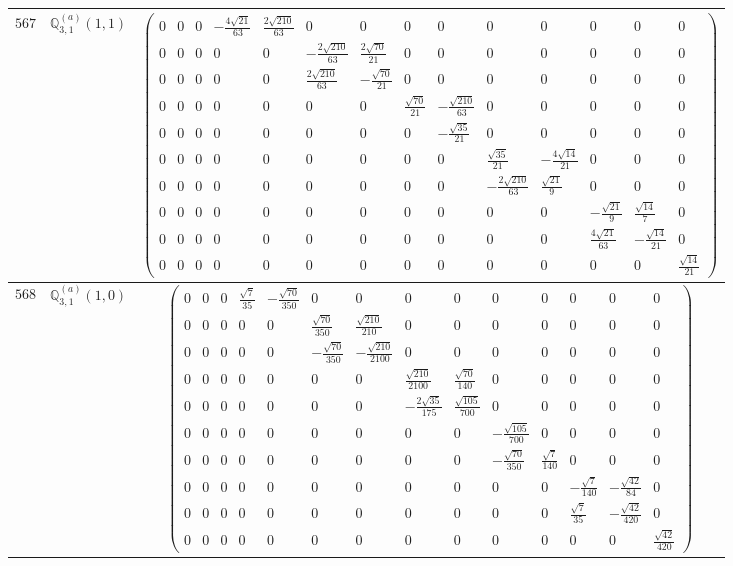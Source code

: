 \documentclass[fleqn,8pt,landscape]{jsarticle}
\begin{document}
\begin{center}
\begin{longtable}{ccc}
$ 567 $ & $ \mathbb{Q}_{3,1}^{(a)}(1,1) $ & $ \begin{pmatrix} 0 & 0 & 0 & - \frac{4 \sqrt{21}}{63} & \frac{2 \sqrt{210}}{63} & 0 & 0 & 0 & 0 & 0 & 0 & 0 & 0 & 0 \\ 0 & 0 & 0 & 0 & 0 & - \frac{2 \sqrt{210}}{63} & \frac{2 \sqrt{70}}{21} & 0 & 0 & 0 & 0 & 0 & 0 & 0 \\ 0 & 0 & 0 & 0 & 0 & \frac{2 \sqrt{210}}{63} & - \frac{\sqrt{70}}{21} & 0 & 0 & 0 & 0 & 0 & 0 & 0 \\ 0 & 0 & 0 & 0 & 0 & 0 & 0 & \frac{\sqrt{70}}{21} & - \frac{\sqrt{210}}{63} & 0 & 0 & 0 & 0 & 0 \\ 0 & 0 & 0 & 0 & 0 & 0 & 0 & 0 & - \frac{\sqrt{35}}{21} & 0 & 0 & 0 & 0 & 0 \\ 0 & 0 & 0 & 0 & 0 & 0 & 0 & 0 & 0 & \frac{\sqrt{35}}{21} & - \frac{4 \sqrt{14}}{21} & 0 & 0 & 0 \\ 0 & 0 & 0 & 0 & 0 & 0 & 0 & 0 & 0 & - \frac{2 \sqrt{210}}{63} & \frac{\sqrt{21}}{9} & 0 & 0 & 0 \\ 0 & 0 & 0 & 0 & 0 & 0 & 0 & 0 & 0 & 0 & 0 & - \frac{\sqrt{21}}{9} & \frac{\sqrt{14}}{7} & 0 \\ 0 & 0 & 0 & 0 & 0 & 0 & 0 & 0 & 0 & 0 & 0 & \frac{4 \sqrt{21}}{63} & - \frac{\sqrt{14}}{21} & 0 \\ 0 & 0 & 0 & 0 & 0 & 0 & 0 & 0 & 0 & 0 & 0 & 0 & 0 & \frac{\sqrt{14}}{21} \end{pmatrix} $ \\ \hline
$ 568 $ & $ \mathbb{Q}_{3,1}^{(a)}(1,0) $ & $ \begin{pmatrix} 0 & 0 & 0 & \frac{\sqrt{7}}{35} & - \frac{\sqrt{70}}{350} & 0 & 0 & 0 & 0 & 0 & 0 & 0 & 0 & 0 \\ 0 & 0 & 0 & 0 & 0 & \frac{\sqrt{70}}{350} & \frac{\sqrt{210}}{210} & 0 & 0 & 0 & 0 & 0 & 0 & 0 \\ 0 & 0 & 0 & 0 & 0 & - \frac{\sqrt{70}}{350} & - \frac{\sqrt{210}}{2100} & 0 & 0 & 0 & 0 & 0 & 0 & 0 \\ 0 & 0 & 0 & 0 & 0 & 0 & 0 & \frac{\sqrt{210}}{2100} & \frac{\sqrt{70}}{140} & 0 & 0 & 0 & 0 & 0 \\ 0 & 0 & 0 & 0 & 0 & 0 & 0 & - \frac{2 \sqrt{35}}{175} & \frac{\sqrt{105}}{700} & 0 & 0 & 0 & 0 & 0 \\ 0 & 0 & 0 & 0 & 0 & 0 & 0 & 0 & 0 & - \frac{\sqrt{105}}{700} & 0 & 0 & 0 & 0 \\ 0 & 0 & 0 & 0 & 0 & 0 & 0 & 0 & 0 & - \frac{\sqrt{70}}{350} & \frac{\sqrt{7}}{140} & 0 & 0 & 0 \\ 0 & 0 & 0 & 0 & 0 & 0 & 0 & 0 & 0 & 0 & 0 & - \frac{\sqrt{7}}{140} & - \frac{\sqrt{42}}{84} & 0 \\ 0 & 0 & 0 & 0 & 0 & 0 & 0 & 0 & 0 & 0 & 0 & \frac{\sqrt{7}}{35} & - \frac{\sqrt{42}}{420} & 0 \\ 0 & 0 & 0 & 0 & 0 & 0 & 0 & 0 & 0 & 0 & 0 & 0 & 0 & \frac{\sqrt{42}}{420} \end{pmatrix} $ \\ \hline

\end{longtable}
\end{center}
\end{document}
